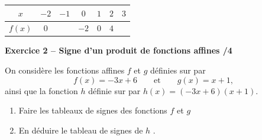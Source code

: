 \documentclass[10pt,a4paper]{article}
\begin{document}
\begin{sujets}
\begin{center}
    \renewcommand{\arraystretch}{1.5}
    \setlength{\tabcolsep}{0.25cm}
    \begin{tabular}{|*{7}{c|}}
    \hline
    \(x\) & \(-2\) & \(-1\) & \(0\) & \(1\) & \(2\) & \(3\) \\
    \hline
    \(f(x)\) & \(0\) & & \(-2\) & \(0\) & \(4\) & \\
    \hline
    \end{tabular}
\end{center}

\textbf{Exercice 2 -- Signe d'un produit de fonctions affines \hfill /4}

On considère les fonctions affines \(f\) et \(g\) définies sur par
\[
f(x)=-3x+6 \qquad\text{et}\qquad g(x)=x+1,
\]
ainsi que la fonction \(h\) définie sur par \(h(x)=(-3x+6)(x+1)\).


\begin{enumerate}
\item Faire les tableaux de signes des fonctions \(f\) et \(g\)

\vspace{4cm}

\item En déduire le tableau de signes de \(h\) .

\vspace{4cm}

\end{enumerate}

\text{ }
\end{sujets}

\newpage

\end{document}
